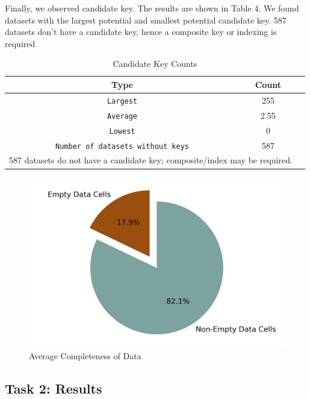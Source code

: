 \documentclass[sigconf,authordraft]{acmart}
\begin{document}
Finally, we observed candidate key. The results are shown in Table 4. We found datasets with the largest potential and smallest potential candidate key. 587 datasets don’t have a candidate key, hence a composite key or indexing is required
\begin{table}[H]
  \caption{Candidate Key Counts}
  \label{tab:commands}
  \begin{tabular}{ccl}
    \toprule
    Type & Count\\
    \midrule
    \texttt{Largest} & 255 \\
    \texttt{Average} & 2.55\\
    \texttt{Lowest} & 0\\
    \texttt{Number of datasets without keys} & 587\\
    \bottomrule
    \multicolumn{2}{l}{\footnotesize 587 datasets do not have a candidate key; composite/index may be required.}\\
  \end{tabular}
\end{table}


\begin{figure}[h]
  \centering
  \includegraphics[width=\linewidth]{avg_completeness_no_title.png}
  \caption{Average Completeness of Data}
\end{figure}



\subsection{Task 2: Results}
\end{document}
